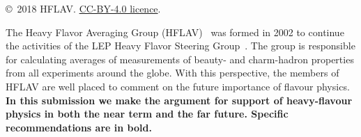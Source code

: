 \documentclass[12pt,a4paper]{article}
\def\papercopyright{2018 HFLAV} %
\def\paperlicence{CC-BY-4.0 licence}
\def\paperlicenceurl{https://creativecommons.org/licenses/by/4.0/}
\begin{document}
\author[18]{M.~Rama}
\author[26]{M.~Roney}
\author[27]{M.~Rotondo}
\author[28]{O.~Schneider}
\author[29]{C.~Schwanda}
\author[30]{A.~J.~Schwartz}
\author[31,32]{B.~Shwartz}
\author[10]{J.~Serrano}
\author[39]{A.~Soffer}
\author[18]{D.~Tonelli}
\author[36]{P.~Urquijo}
\author[37]{R.~Van Kooten}
\author[38]{J.~Yelton}

\maketitle

{\footnotesize 
\centerline{\copyright~\papercopyright. \href{\paperlicenceurl}{\paperlicence}.}}
\vspace*{1cm}

\renewcommand{\thefootnote}{\arabic{footnote}}
\setcounter{footnote}{0}



\pagestyle{plain} %
\setcounter{page}{1}

\linenumbers
\parskip=2mm

\noindent The Heavy Flavor Averaging Group (HFLAV)~\cite{HFLAV16} was formed in 2002 to 
continue the activities of the LEP Heavy Flavor Steering 
Group~\cite{Abbaneo:2000ej_mod,*Abbaneo:2001bv_mod_cont}. 
The group is responsible for calculating averages of measurements of beauty- and charm-hadron properties from all experiments around the globe. With this perspective, the members of HFLAV are well 
placed to comment on the future importance of flavour physics. \textbf{In this submission we make the argument for support of heavy-flavour physics in both the near term and the far future. Specific recommendations are in bold.}
\end{document}

